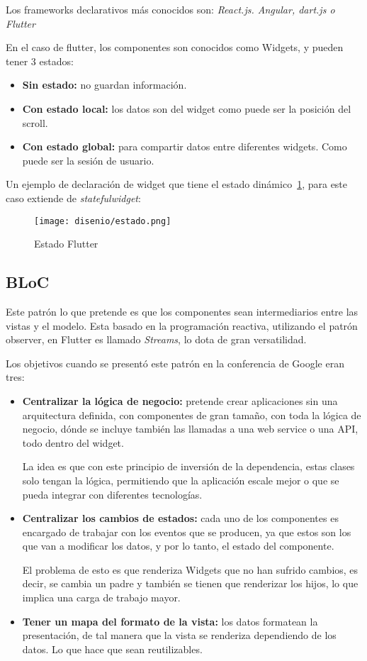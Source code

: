 Los frameworks declarativos más conocidos son: \emph{React.js. Angular, dart.js o Flutter}

En el caso de flutter, los componentes son conocidos como Widgets, y pueden tener 3 estados:

\begin{itemize}
	\item \textbf{Sin estado:} no guardan información.
	\item \textbf{Con estado local:} los datos son del widget como puede ser la posición del scroll.
	\item \textbf{Con estado global:} para compartir datos entre diferentes widgets. Como puede ser la sesión de usuario.
\end{itemize}

Un ejemplo de declaración de widget que tiene el estado dinámico~\ref{fig:estado}, para este caso extiende de \emph{statefulwidget}:
	\begin{figure}[H]
		\centering
		\texttt{[image: disenio/estado.png]}
		\caption{Estado Flutter}\label{fig:estado}
	\end{figure}

\subsection{BLoC}\label{bloc}
Este patrón lo que pretende es que los componentes sean intermediarios entre las vistas y el modelo. Esta basado en la programación reactiva, utilizando el patrón observer, en Flutter es llamado \emph{Streams}, lo dota de gran versatilidad.

Los objetivos cuando se presentó este patrón en la conferencia de Google eran tres:

\begin{itemize}
	\item \textbf{Centralizar la lógica de negocio:} pretende crear aplicaciones sin una arquitectura definida, con componentes de gran tamaño, con toda la lógica de negocio, dónde se incluye también las llamadas a una web service o una API, todo dentro del widget.
	
	La idea es que con este principio de inversión de la dependencia, estas clases solo tengan la lógica, permitiendo que la aplicación escale mejor o que se pueda integrar con diferentes tecnologías.
	
	\item \textbf{Centralizar los cambios de estados:} cada uno de los componentes es encargado de trabajar con los eventos que se producen, ya que estos son los que van a modificar los datos, y por lo tanto, el estado del componente.
	
	El problema de esto es que renderiza Widgets que no han sufrido cambios, es decir, se cambia un padre y también se tienen que renderizar los hijos, lo que implica una carga de trabajo mayor.
	
	\item \textbf{Tener un mapa del formato de la vista:} los datos formatean la presentación, de tal manera que la vista se renderiza dependiendo de los datos. Lo que hace que sean reutilizables.
	
\end{itemize}

